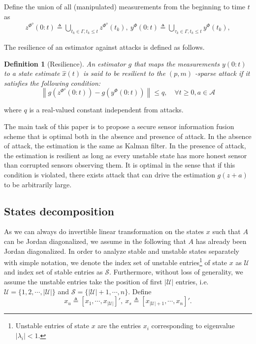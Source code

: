 \documentclass[12pt]{article}
\newcommand{\Uc}{{\mathcal{U}}}
\newcommand{\Sc}{{\mathcal{S}}}
\newcommand{\Ss}{{\mathscr{S}}}
\newcommand{\gm}{{\Gamma}}
\newtheorem{definition}{\textbf{Definition}}
\begin{document}

Define the union of all (manipulated) measurements from the beginning to time $t$ as
\begin{align*}
z^{\Phi^o}(0:t)\triangleq \bigcup_{t_k\in\gm,t_k\leq t} z^{\Phi^o}(t_k), \
y^\Phi(0:t)\triangleq \bigcup_{\tau_k\in\gm,t_k\leq t} y^\Phi(t_k),
\end{align*}

The resilience of an estimator against attacks is defined as follows.
\begin{definition}[Resilience]
	An estimator $g$ that maps the measurements $y(0:t)$ to a state estimate $\hat{x}(t)$ is said to be resilient to the $(p, m)$ -sparse attack if it satisfies the following condition:
	$$
	\left\|g\left(z^{\Phi^o}(0:t)\right)-g\left(y^\Phi(0:t)\right)\right\| \leq q, \quad \forall t\geq0,  a \in \mathcal{A}
	$$
\end{definition}
where $q$ is a real-valued constant independent from attacks.

The main task of this paper is to propose a secure sensor information fusion scheme that is optimal both in the absence and presence of attack.
In the absence of attack, the estimation is the same as Kalman filter. In the presence of attack, the estimation is resilient as long as every unstable state has more honest sensor than corrupted sensors observing them. It is optimal in the sense that if this condition is violated, there exists attack that can drive the estimation $g(z+a)$ to be arbitrarily large\cite{yorie}.

\subsection{States decomposition}\label{subsec:transform}

As we can always do invertible linear transformation on the states $x$ such that $A$ can be Jordan diagonalized, we assume in the following that $A$ has already been Jordan diagonalized. 
In order to analyze stable and unstable states separately with simple notation, we denote the index set of unstable entries\footnote{Unstable entries of state $x$ are the entries $x_i$ corresponding to eigenvalue $|\lambda_i| <1$.} of state $x$ as $\Uc$ and index set of stable entries as $\Sc$. 
Furthermore, without loss of generality, we assume the unstable entries take the position of first $|\Uc|$ entries, i.e. $\Uc=\{1,2,\cdots,|\Uc|\}$ and $\Sc=\{|\Uc|+1,\cdots,n\}$.
Define 
\begin{equation}\label{eq:def_x_u}
	x_u\triangleq [x_1,\cdots,x_{|\Uc|}]{'}, \ x_s\triangleq [x_{|\Uc|+1},\cdots,x_{n}]{'}.
\end{equation}
\end{document}
